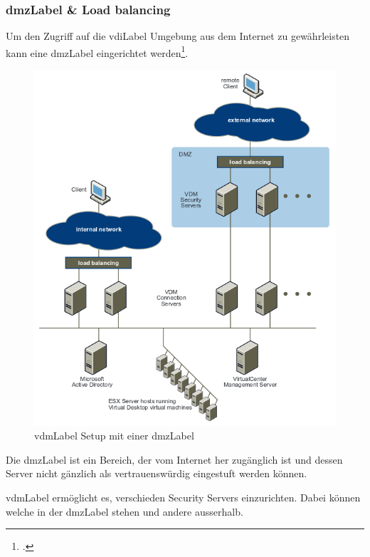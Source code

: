 \begin{minipage}{\textwidth}
\subsubsection{\Gls{dmzLabel} \& Load balancing}
Um den Zugriff auf die \Gls{vdiLabel} Umgebung aus dem Internet zu gewährleisten kann eine \Gls{dmzLabel} eingerichtet werden\footcite{Introduction_to_Virtual_Desktop_Manager}. 

\begin{figure}[H]
	\includegraphics[width=\textwidth]{images/vmware-vdm-dmz2}
	\caption{\Gls{vdmLabel} Setup mit einer \Gls{dmzLabel}}
	\label{fig:vdmSetupDmz}
\end{figure}
\end{minipage}

Die \Gls{dmzLabel} ist ein Bereich, der vom Internet her zugänglich ist und dessen Server nicht gänzlich als vertrauenswürdig eingestuft werden können.

\Gls{vdmLabel} ermöglicht es, verschieden Security Servers einzurichten. Dabei können welche in der \Gls{dmzLabel} stehen und andere ausserhalb.

